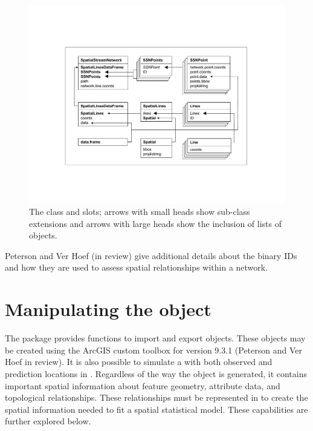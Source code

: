 \documentclass[nojss]{jss}
\begin{document}
\begin{figure}[ht]
  \begin{center}
      \includegraphics[width=\textwidth,keepaspectratio]{Figures/jss984Fig-SSNclass.pdf}
  \end{center}
  \caption{The  class and slots; arrows with small heads show
    sub-class extensions and arrows with large heads show the inclusion of lists of
    objects. \label{SSNclass}}
\end{figure}

Peterson and Ver Hoef (in review) give additional details about
the binary IDs and how they are used to assess spatial relationships
within a network.


%
%

\section[Manipulating the SpatialStreamNetwork object]{Manipulating the  object}\label{manipSSNobj}

The  package provides functions to import and export
 objects. These objects may be created
using the  ArcGIS custom toolbox for version 9.3.1
(Peterson and Ver Hoef in review).  It is also possible to simulate a
 with both observed and prediction
locations in . Regardless of the way the object is
generated, it contains important spatial information about feature
geometry, attribute data, and topological relationships. These
relationships must be represented in  to create the
spatial information needed to fit a spatial statistical model. These
capabilities are further explored below.
\end{document}

